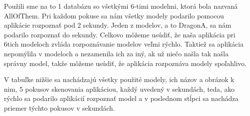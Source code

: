 Použili sme na to 1 databázu so všetkými 6-timi modelmi, ktorá bola nazvaná AllOfThem. Pri každom pokuse sa nám všetky modely podarilo pomocou aplikácie rozpoznať pod 2 sekundy. Jeden z modelov, a to DragonA, sa nám podarilo rozpoznať do sekundy. Celkovo môžeme usúdiť, že naša aplikácia pri 6tich modeloch zvláda rozpoznávanie modelov veľmi rýchlo. Taktiež sa aplikácia nepomýlila v modeloch a nezamenila ich za iný, ak už niečo našla tak našla správny model, takže môžeme usúdiť, že aplikácia rozpoznáva modely spoľahlivo.

V tabuľke nižšie sa nachádzajú všetky použité modely, ich názov a obrázok k nim, 5 pokusov skenovania aplikáciou, každý uvedený v sekundách, teda, ako rýchlo sa podarilo aplikácií rozpoznať model a v poslednom stĺpci sa nachádza priemer týchto pokusov v sekundách.

